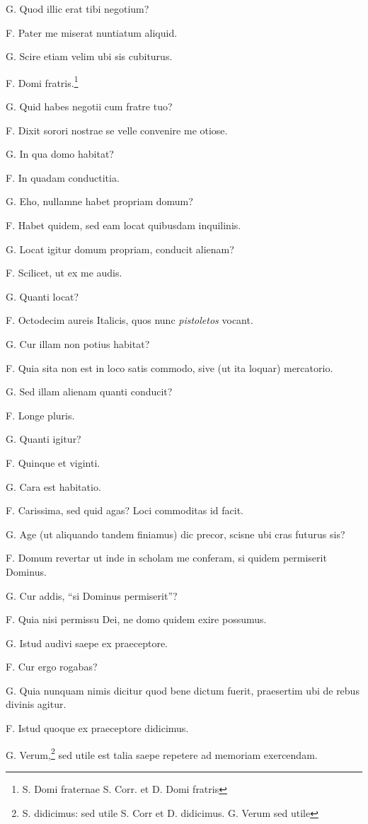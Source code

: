 \documentclass{article}
\begin{document}
G. Quod illic erat tibi negotium?

F. Pater me miserat nuntiatum aliquid. 

G. Scire etiam velim ubi sis cubiturus. 

F. Domi fratris.\footnote{S. Domi fraternae S. Corr. et D. Domi fratris}

G. Quid habes negotii cum fratre tuo?

F. Dixit sorori nostrae se velle convenire me otiose. 

G. In qua domo habitat?

F. In quadam conductitia. 

G. Eho, nullamne habet propriam domum?

F. Habet quidem, sed eam locat quibusdam inquilinis. 

G. Locat igitur domum propriam, conducit alienam?

F. Scilicet, ut ex me audis. 

G. Quanti locat?

F. Octodecim aureis Italicis, quos nunc \emph{pistoletos} vocant. 

G. Cur illam non potius habitat?

F. Quia sita non est in loco satis commodo, sive (ut ita loquar) mercatorio. 

G. Sed illam alienam quanti conducit?

F. Longe pluris. 

G. Quanti igitur?

F. Quinque et viginti. 

G. Cara est habitatio. 

F. Carissima, sed quid agas? Loci commoditas id facit. 

G. Age (ut aliquando tandem finiamus) dic precor, scisne ubi cras futurus sis?

F. Domum revertar ut inde in scholam me conferam, si quidem permiserit Dominus. 

G. Cur addis, ``si Dominus permiserit''?

F. Quia nisi permissu Dei, ne domo quidem exire possumus. 

G. Istud audivi saepe ex praeceptore. 

F. Cur ergo rogabas?

G. Quia nunquam nimis dicitur quod bene dictum fuerit, praesertim ubi de rebus divinis agitur. 

F. Istud quoque ex praeceptore didicimus. 

G. Verum,\footnote{S. didicimus: sed utile S. Corr et D. didicimus. G. Verum sed utile} sed utile est talia saepe repetere ad memoriam exercendam. 
\end{document}
